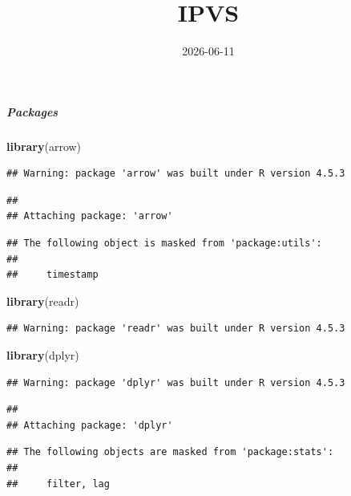 \documentclass[
]{article}
\title{IPVS}
\author{}
\date{\vspace{-2.5em}2026-06-11}
\newenvironment{Shaded}{\begin{snugshade}}{\end{snugshade}}
\newcommand{\FunctionTok}[1]{\textcolor[rgb]{0.13,0.29,0.53}{\textbf{#1}}}
\newcommand{\NormalTok}[1]{#1}
\begin{document}
\maketitle

\subparagraph{Packages}\label{packages}

\begin{Shaded}
\begin{Highlighting}[]
\FunctionTok{library}\NormalTok{(arrow) }
\end{Highlighting}
\end{Shaded}

\begin{verbatim}
## Warning: package 'arrow' was built under R version 4.5.3
\end{verbatim}

\begin{verbatim}
## 
## Attaching package: 'arrow'
\end{verbatim}

\begin{verbatim}
## The following object is masked from 'package:utils':
## 
##     timestamp
\end{verbatim}

\begin{Shaded}
\begin{Highlighting}[]
\FunctionTok{library}\NormalTok{(readr) }
\end{Highlighting}
\end{Shaded}

\begin{verbatim}
## Warning: package 'readr' was built under R version 4.5.3
\end{verbatim}

\begin{Shaded}
\begin{Highlighting}[]
\FunctionTok{library}\NormalTok{(dplyr) }
\end{Highlighting}
\end{Shaded}

\begin{verbatim}
## Warning: package 'dplyr' was built under R version 4.5.3
\end{verbatim}

\begin{verbatim}
## 
## Attaching package: 'dplyr'
\end{verbatim}

\begin{verbatim}
## The following objects are masked from 'package:stats':
## 
##     filter, lag
\end{verbatim}
\end{document}
